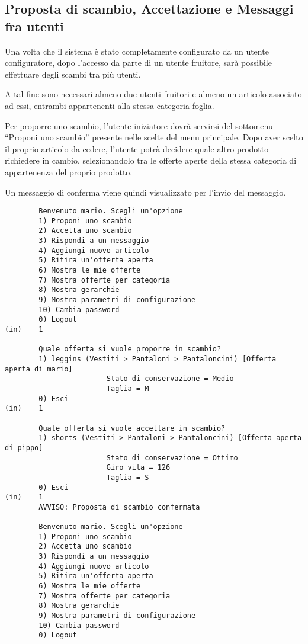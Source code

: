 \subsection{Proposta di scambio, Accettazione e Messaggi fra utenti}

Una volta che il sistema è stato completamente configurato da un utente configuratore, dopo l'accesso da parte di un utente fruitore, sarà possibile effettuare degli scambi tra più utenti.

A tal fine sono necessari almeno due utenti fruitori e almeno un articolo associato ad essi, entrambi appartenenti alla stessa categoria foglia.

Per proporre uno scambio, l'utente iniziatore dovrà servirsi del sottomenu ``Proponi uno scambio'' presente nelle scelte del menu principale. Dopo aver scelto il proprio articolo da cedere, l'utente potrà decidere quale altro prodotto richiedere in cambio, selezionandolo tra le offerte aperte della stessa categoria di appartenenza del proprio prodotto. 

Un messaggio di conferma viene quindi visualizzato per l'invio del messaggio.

\begin{lstlisting}
        Benvenuto mario. Scegli un'opzione
        1) Proponi uno scambio
        2) Accetta uno scambio
        3) Rispondi a un messaggio
        4) Aggiungi nuovo articolo
        5) Ritira un'offerta aperta
        6) Mostra le mie offerte
        7) Mostra offerte per categoria
        8) Mostra gerarchie
        9) Mostra parametri di configurazione
        10) Cambia password
        0) Logout
(in)    1

        Quale offerta si vuole proporre in scambio?
        1) leggins (Vestiti > Pantaloni > Pantaloncini) [Offerta aperta di mario]
                        Stato di conservazione = Medio
                        Taglia = M
        0) Esci
(in)    1

        Quale offerta si vuole accettare in scambio?
        1) shorts (Vestiti > Pantaloni > Pantaloncini) [Offerta aperta di pippo]
                        Stato di conservazione = Ottimo
                        Giro vita = 126
                        Taglia = S
        0) Esci
(in)    1
        AVVISO: Proposta di scambio confermata

        Benvenuto mario. Scegli un'opzione
        1) Proponi uno scambio
        2) Accetta uno scambio
        3) Rispondi a un messaggio
        4) Aggiungi nuovo articolo
        5) Ritira un'offerta aperta
        6) Mostra le mie offerte
        7) Mostra offerte per categoria
        8) Mostra gerarchie
        9) Mostra parametri di configurazione
        10) Cambia password
        0) Logout
\end{lstlisting}

